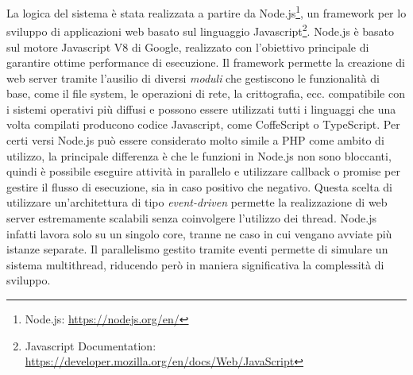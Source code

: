 La logica del sistema è stata realizzata a partire da Node.js\footnote{Node.js: \url{https://nodejs.org/en/}}, un framework per lo sviluppo di applicazioni web basato sul linguaggio Javascript\footnote{Javascript Documentation: \url{https://developer.mozilla.org/en/docs/Web/JavaScript}}. Node.js è basato sul motore Javascript V8 di Google, realizzato con l'obiettivo principale di garantire ottime performance di esecuzione. Il framework permette la creazione di web server tramite l'ausilio di diversi \emph{moduli} che gestiscono le funzionalità di base, come il file system, le operazioni di rete, la crittografia, ecc. \upe compatibile con i sistemi operativi più diffusi e possono essere utilizzati tutti i linguaggi che una volta compilati producono codice Javascript, come CoffeScript o TypeScript. Per certi versi Node.js può essere considerato molto simile a PHP come ambito di utilizzo, la principale differenza è che le funzioni in Node.js non sono bloccanti, quindi è possibile eseguire attività in parallelo e utilizzare callback o promise per gestire il flusso di esecuzione, sia in caso positivo che negativo. Questa scelta di utilizzare un'architettura di tipo \emph{event-driven} permette la realizzazione di web server estremamente scalabili senza coinvolgere l'utilizzo dei thread. Node.js infatti lavora solo su un singolo core, tranne ne caso in cui vengano avviate più istanze separate. Il parallelismo gestito tramite eventi permette di simulare un sistema multithread, riducendo però in maniera significativa la complessità di sviluppo.

